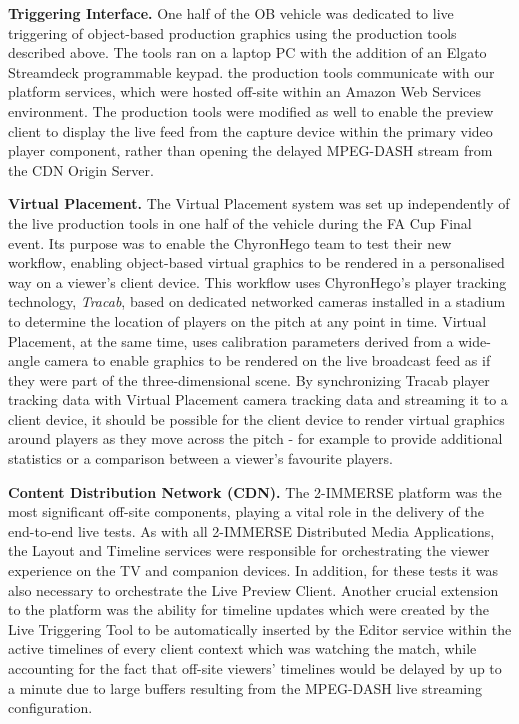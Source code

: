 \documentclass[sigchi-a, authorversion]{acmart}
\begin{document}
\vspace{5pt}\noindent\textbf{Triggering Interface.} One half of the OB vehicle was dedicated to live
triggering of object-based production graphics using the production tools
described above. The tools ran on a laptop PC with the addition of an Elgato
Streamdeck programmable keypad. the production tools communicate with our
platform services, which were hosted off-site within an Amazon Web Services
environment. The production tools were modified as well to enable the preview
client to display the live feed from the capture device within the primary video
player component, rather than opening the delayed MPEG-DASH stream from the CDN
Origin Server.

\vspace{5pt}\noindent\textbf{Virtual Placement.} The Virtual Placement system was set up independently
of the live production tools in one half of the vehicle during the FA Cup Final
event. Its purpose was to enable the ChyronHego team to test their new workflow,
enabling object-based virtual graphics to be rendered in a personalised way on
a viewer's client device. This workflow uses ChyronHego's player tracking
technology, \emph{Tracab}, based on dedicated networked cameras installed in a stadium
to determine the location of players on the pitch at any point in time. Virtual
Placement, at the same time, uses calibration parameters derived from a wide-angle
camera to enable graphics to be rendered on the live broadcast feed as if they
were part of the three-dimensional scene. By synchronizing Tracab player tracking
data with Virtual Placement camera tracking data and streaming it to a client
device, it should be possible for the client device to render virtual graphics
around players as they move across the pitch - for example to provide additional
statistics or a comparison between a viewer's favourite players.

\vspace{5pt}\noindent\textbf{Content Distribution Network (CDN).} The 2-IMMERSE platform \cite{kegel2017} was the most significant
off-site components, playing a vital role in the delivery of the end-to-end live
tests. As with all 2-IMMERSE Distributed Media Applications, the Layout and
Timeline services were responsible for orchestrating the viewer experience on
the TV and companion devices. In addition, for these tests it was also necessary
to orchestrate the Live Preview Client. Another crucial extension to the platform
was the ability for timeline updates which were created by the Live Triggering
Tool to be automatically inserted by the Editor service within the active
timelines of every client context which was watching the match, while accounting
for the fact that off-site viewers' timelines would be delayed by up to a minute
due to large buffers resulting from the MPEG-DASH live streaming configuration.
\end{document}
